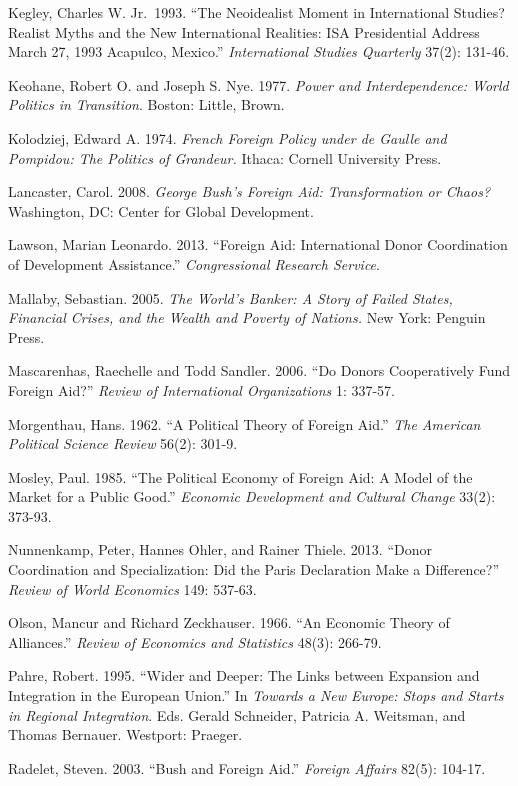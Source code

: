 \documentclass[12pt,]{article}
\begin{document}
Kegley, Charles W. Jr.~1993. ``The Neoidealist Moment in International
Studies? Realist Myths and the New International Realities: ISA
Presidential Address March 27, 1993 Acapulco, Mexico.''
\emph{International Studies Quarterly} 37(2): 131-46.

Keohane, Robert O. and Joseph S. Nye. 1977. \emph{Power and
Interdependence: World Politics in Transition}. Boston: Little, Brown.

Kolodziej, Edward A. 1974. \emph{French Foreign Policy under de Gaulle
and Pompidou: The Politics of Grandeur.} Ithaca: Cornell University
Press.

Lancaster, Carol. 2008. \emph{George Bush's Foreign Aid: Transformation
or Chaos?} Washington, DC: Center for Global Development.

Lawson, Marian Leonardo. 2013. ``Foreign Aid: International Donor
Coordination of Development Assistance.'' \emph{Congressional Research
Service}.

Mallaby, Sebastian. 2005. \emph{The World's Banker: A Story of Failed
States, Financial Crises, and the Wealth and Poverty of Nations.} New
York: Penguin Press.

Mascarenhas, Raechelle and Todd Sandler. 2006. ``Do Donors Cooperatively
Fund Foreign Aid?'' \emph{Review of International Organizations} 1:
337-57.

Morgenthau, Hans. 1962. ``A Political Theory of Foreign Aid.'' \emph{The
American Political Science Review} 56(2): 301-9.

Mosley, Paul. 1985. ``The Political Economy of Foreign Aid: A Model of
the Market for a Public Good.'' \emph{Economic Development and Cultural
Change} 33(2): 373-93.

Nunnenkamp, Peter, Hannes Ohler, and Rainer Thiele. 2013. ``Donor
Coordination and Specialization: Did the Paris Declaration Make a
Difference?'' \emph{Review of World Economics} 149: 537-63.

Olson, Mancur and Richard Zeckhauser. 1966. ``An Economic Theory of
Alliances.'' \emph{Review of Economics and Statistics} 48(3): 266-79.

Pahre, Robert. 1995. ``Wider and Deeper: The Links between Expansion and
Integration in the European Union.'' In \emph{Towards a New Europe:
Stops and Starts in Regional Integration}. Eds. Gerald Schneider,
Patricia A. Weitsman, and Thomas Bernauer. Westport: Praeger.

Radelet, Steven. 2003. ``Bush and Foreign Aid.'' \emph{Foreign Affairs}
82(5): 104-17.
\end{document}
